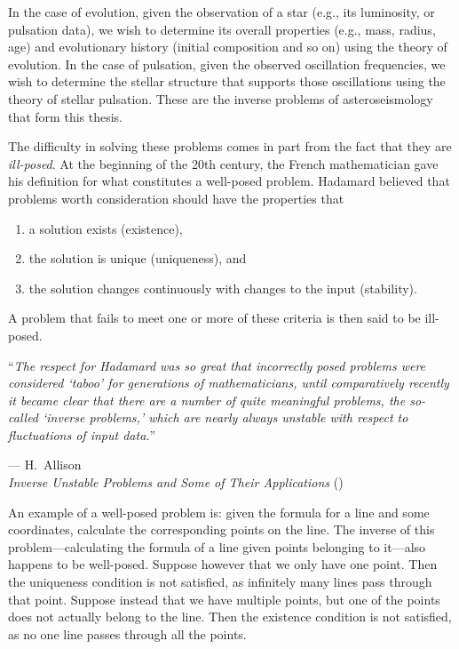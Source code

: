 In the case of evolution, given the observation of a star (e.g., its luminosity, or pulsation data), we wish to determine its overall properties (e.g., mass, radius, age) and evolutionary history (initial composition and so on) using the theory of evolution. 
In the case of pulsation, given the observed oscillation frequencies, we wish to determine the stellar structure that supports those oscillations using the theory of stellar pulsation. 
These are the inverse problems of asteroseismology that form this thesis. 



%


The difficulty in solving these problems comes in part from the fact that they are \emph{ill-posed}. 
At the beginning of the 20th century, the French mathematician  gave his definition for what constitutes a well-posed problem. 
Hadamard believed that problems worth consideration should have the properties that
\begin{enumerate}
    \item a solution exists (existence), 
    \item the solution is unique (uniqueness), and 
    \item the solution changes continuously with changes to the input (stability). 
\end{enumerate}
A problem that fails to meet one or more of these criteria is then said to be ill-posed. 

\epigraph{``\emph{The respect for Hadamard was so great that incorrectly posed problems were \hphantom{``}considered `taboo' for generations of mathematicians, until comparatively recently \hphantom{``}it became clear that there are a number of quite meaningful problems, the so-called \hphantom{``}`inverse problems,' which are nearly always unstable with respect to fluctuations \hphantom{``}of input data.}''}{--- H.\ Allison\\\emph{Inverse Unstable Problems and Some of Their Applications} (\citeyear{allison1979inverse})}

An example of a well-posed problem is: given the formula for a line and some coordinates, calculate the corresponding points on the line. 
The inverse of this problem---calculating the formula of a line given points belonging to it---also happens to be well-posed. 
Suppose however that we only have one point. 
Then the uniqueness condition is not satisfied, as infinitely many lines pass through that point. 
Suppose instead that we have multiple points, but one of the points does not actually belong to the line. 
Then the existence condition is not satisfied, as no one line passes through all the points. 

